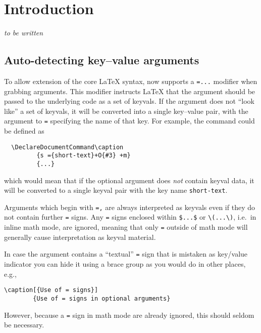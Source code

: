 \documentclass{ltnews}
\providecommand\tubcommand[1]{}
\begin{document}
\tubcommand{\addtolength\textheight{4.2pc}}   %

\maketitle
{  \spaceskip=3.33pt 
\tableofcontents}

\setlength{}


\medskip


\section{Introduction}

\emph{to be written}


\subsection{Auto-detecting key--value arguments}

To allow extension of the core \LaTeX{} syntax,  now supports
a \texttt{={...}} modifier when grabbing arguments. This modifier instructs
\LaTeX{} that the argument should be passed to the underlying code as
a set of keyvals. If the argument does not \enquote{look like} a set
of keyvals, it will be converted into a single key--value pair, with
the argument to \texttt{=} specifying the name of that key. For
example, the  command could be defined as
\begin{verbatim}
  \DeclareDocumentCommand\caption
         {s ={short-text}+O{#3} +m}
         {...}
\end{verbatim}
which would mean that if the optional argument does \emph{not}
contain keyval data, it will be converted to a single keyval
pair with the key name \texttt{short-text}.

Arguments which begin with \texttt{=,} are always interpreted as
keyvals even if they do not contain further \texttt{=} signs.
Any \texttt{=} signs enclosed within \verb|$...$| or \verb|\(...\)|,
i.e.~in inline math mode, are ignored, meaning that
only \texttt{=} outside of math mode will generally cause
interpretation as keyval material.

In case the argument contains a \enquote{textual} \texttt{=} sign that
is mistaken as key/value indicator you can hide it using a brace
group as you would do in other places, e.g.,
\begin{verbatim}
\caption[{Use of = signs}]
        {Use of = signs in optional arguments}
\end{verbatim}
However, because a \texttt{=} sign in math mode are already ignored, this
should seldom be necessary.
\end{document}
